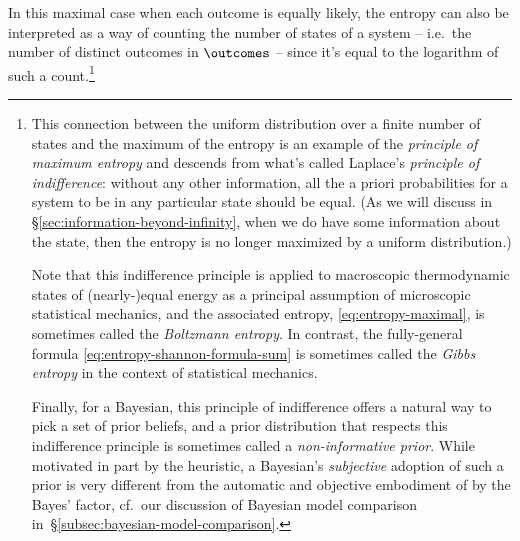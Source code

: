 In this maximal case when each outcome is equally likely, the entropy can also be interpreted as a way of counting the number of states of a system -- i.e.~the number of distinct outcomes in $\outcomes$ -- since it's equal to the logarithm of such a count.\footnote{This connection between the uniform distribution over a finite number of states and the maximum of the entropy is an example of the \emph{principle of maximum entropy} and descends from what's called Laplace's \emph{principle of indifference}: without any other information, all the a priori probabilities 
for a system to be in any particular state should be equal.
(As we will discuss in \S\ref{sec:information-beyond-infinity}, when we do have some information about the state, then the entropy is no longer maximized by a uniform distribution.)

Note that this indifference principle is applied to macroscopic thermodynamic states of (nearly-)equal energy as a principal assumption of microscopic statistical mechanics, and the associated entropy, \eqref{eq:entropy-maximal}, is sometimes called the \emph{Boltzmann entropy}.
In contrast, the fully-general formula \eqref{eq:entropy-shannon-formula-sum}   is sometimes called the \emph{Gibbs entropy} in the context of statistical mechanics. %


Finally, for a Bayesian, this principle of indifference offers a natural way to pick a set of prior beliefs, and a prior distribution that respects this indifference principle is sometimes called a \emph{non-informative prior}. While motivated in part by the  heuristic, a Bayesian's \emph{subjective} adoption of such a prior  is very different from the automatic and objective embodiment of  by the Bayes' factor, cf.~our discussion of Bayesian model comparison in~\S\ref{subsec:bayesian-model-comparison}.
}




